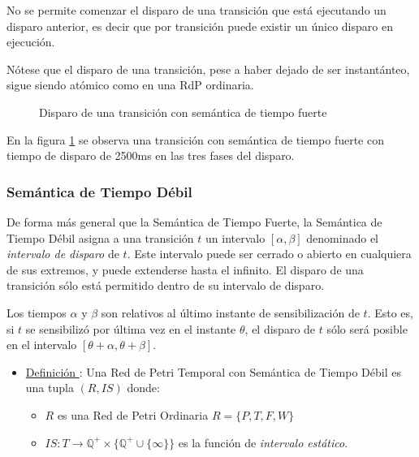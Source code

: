 No se permite comenzar el disparo de una transición que está ejecutando un
disparo anterior, es decir que por transición puede existir un único disparo en
ejecución.

Nótese que el disparo de una transición, pese a haber dejado de ser
instantánteo, sigue siendo atómico como en una RdP ordinaria.

\begin{figure}[h]
  \centering
  \caption{Disparo de una transición con semántica de tiempo fuerte}
  \label{fig:disparo_tiempo_fuerte}
\end{figure}

En la figura \ref{fig:disparo_tiempo_fuerte} se observa una transición con
semántica de tiempo fuerte con tiempo de disparo de 2500ms en las tres fases del
disparo.

\subsubsection{Semántica de Tiempo Débil}
\label{semantica_tiempo_debil}

De forma más general que la Semántica de Tiempo Fuerte, la Semántica de
Tiempo Débil asigna a una transición $t$ un intervalo $[\alpha, \beta]$
denominado el \textit{intervalo de disparo} de $t$. Este intervalo puede ser cerrado o
abierto en cualquiera de sus extremos, y puede extenderse hasta el infinito. El
disparo de una transición sólo está permitido dentro de su intervalo de disparo.

Los tiempos $\alpha$ y $\beta$ son relativos al último instante de
sensibilización de $t$.
Esto es, si $t$ se sensibilizó por última vez en el instante $\theta$, el
disparo de $t$ sólo será posible en el intervalo $[\theta + \alpha, \theta
+ \beta]$. \cite{PetriNetsFundamentals}

\begin{itemize}
  \item \underline{Definición \thedefinitionsCounter}: Una Red de Petri Temporal con Semántica de
  Tiempo Débil es una tupla $(R, IS)$ donde:
  \begin{itemize}
    \item $R$ es una Red de Petri Ordinaria $R = \{P, T, F, W \}$
    \item $IS: T \rightarrow \mathbb{Q^{+}} \times \{ \mathbb{Q^{+}} \cup \{
    \infty \} \}$ es la función de \textit{intervalo estático}.
  \end{itemize}
\end{itemize}

